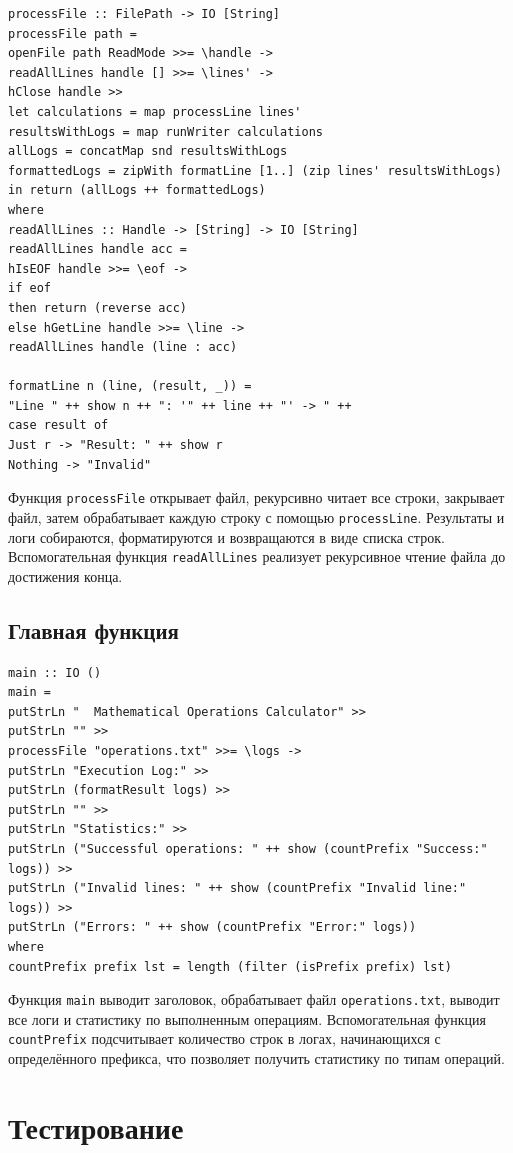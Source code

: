 \documentclass[a4paper, final]{article}
\begin{document}
\begin{lstlisting}
processFile :: FilePath -> IO [String]
processFile path = 
openFile path ReadMode >>= \handle ->
readAllLines handle [] >>= \lines' ->
hClose handle >>
let calculations = map processLine lines'
resultsWithLogs = map runWriter calculations
allLogs = concatMap snd resultsWithLogs
formattedLogs = zipWith formatLine [1..] (zip lines' resultsWithLogs)
in return (allLogs ++ formattedLogs)
where
readAllLines :: Handle -> [String] -> IO [String]
readAllLines handle acc =
hIsEOF handle >>= \eof ->
if eof
then return (reverse acc)
else hGetLine handle >>= \line ->
readAllLines handle (line : acc)

formatLine n (line, (result, _)) =
"Line " ++ show n ++ ": '" ++ line ++ "' -> " ++ 
case result of
Just r -> "Result: " ++ show r
Nothing -> "Invalid"
\end{lstlisting}

Функция \texttt{processFile} открывает файл, рекурсивно читает все строки, закрывает файл, затем обрабатывает каждую строку с помощью \texttt{processLine}. Результаты и логи собираются, форматируются и возвращаются в виде списка строк. Вспомогательная функция \texttt{readAllLines} реализует рекурсивное чтение файла до достижения конца.

\subsection{Главная функция}

\begin{lstlisting}
main :: IO ()
main =
putStrLn "  Mathematical Operations Calculator" >>
putStrLn "" >>
processFile "operations.txt" >>= \logs ->
putStrLn "Execution Log:" >>
putStrLn (formatResult logs) >>
putStrLn "" >>
putStrLn "Statistics:" >>
putStrLn ("Successful operations: " ++ show (countPrefix "Success:" logs)) >>
putStrLn ("Invalid lines: " ++ show (countPrefix "Invalid line:" logs)) >>
putStrLn ("Errors: " ++ show (countPrefix "Error:" logs))
where
countPrefix prefix lst = length (filter (isPrefix prefix) lst)
\end{lstlisting}

Функция \texttt{main} выводит заголовок, обрабатывает файл \texttt{operations.txt}, выводит все логи и статистику по выполненным операциям. Вспомогательная функция \texttt{countPrefix} подсчитывает количество строк в логах, начинающихся с определённого префикса, что позволяет получить статистику по типам операций.


\newpage
\section{Тестирование}
\end{document}

